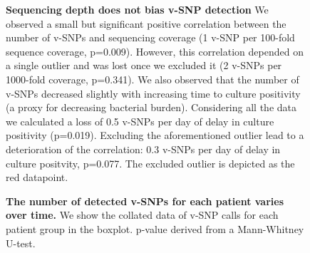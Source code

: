 \documentclass[12pt, oneside]{article}   	%
\begin{document}
\begin{figure}
\label{fig:supfig6}
\centering
{}
\caption{\textbf{Sequencing depth does not bias v-SNP detection} We observed a small but significant positive correlation between the number of v-SNPs and sequencing coverage (1 v-SNP per 100-fold sequence coverage, p=0.009). However, this correlation depended on a single outlier and was lost once we excluded it (2 v-SNPs per 1000-fold coverage, p=0.341). We also observed that the number of v-SNPs decreased slightly with increasing time to culture positivity (a proxy for decreasing bacterial burden). Considering all the data we calculated a loss of 0.5 v-SNPs per day of delay in culture positivity (p=0.019). Excluding the aforementioned outlier lead to a deterioration of the correlation: 0.3 v-SNPs per day of delay in culture positvity, p=0.077. The excluded outlier is depicted as the red datapoint.}
\end{figure}

\begin{figure}
\label{fig:supfig7}
\centering
{}
\caption{\textbf{The number of detected v-SNPs for each patient varies over time.} We show the collated data of v-SNP calls for each patient group in the boxplot. p-value derived from a Mann-Whitney U-test.}
\end{figure}
\end{document}
